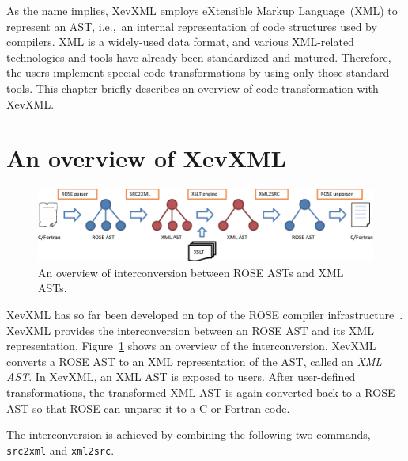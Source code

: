 As the name implies, XevXML employs eXtensible Markup Language~(XML) to
represent an AST, i.e.,~an internal representation of code structures
used by compilers.  XML is a widely-used data format, and various
XML-related technologies and tools have already been standardized and
matured.  Therefore, the users implement special code transformations by
using only those standard tools.  This chapter briefly describes an
overview of code transformation with XevXML.

\section{An overview of XevXML}
\begin{figure}[htb]
 \includegraphics[width=\textwidth]{overview.eps}
 \caption{An overview of interconversion between ROSE ASTs and XML
 ASTs.}\label{fig:overview}
\end{figure}

XevXML has so far been developed on top of the ROSE compiler
infrastructure~\cite{rose}.  XevXML provides the interconversion between
an ROSE AST and its XML representation. Figure~\ref{fig:overview} shows
an overview of the interconversion.  XevXML converts a ROSE AST to an
XML representation of the AST, called an \emph{XML AST}. In XevXML, an
XML AST is exposed to users.  After user-defined transformations, the
transformed XML AST is again converted back to a ROSE AST so that ROSE
can unparse it to a C or Fortran code.

The interconversion is achieved by combining the following two commands,
\texttt{src2xml} and \texttt{xml2src}.

